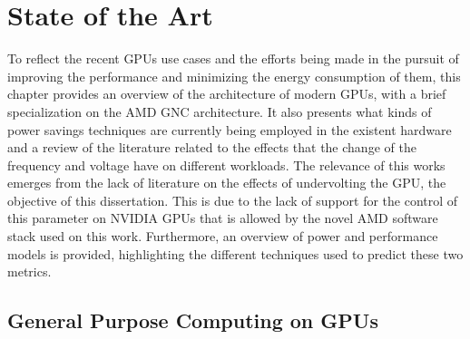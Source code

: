 
\chapter{State of the Art}
\label{chapter:stateoftheart}


To reflect the recent GPUs use cases and the efforts being made in the pursuit of improving the performance and minimizing the energy consumption of them, this chapter provides an overview of the architecture of modern GPUs, with a brief specialization on the AMD GNC architecture. It also presents what kinds of power savings techniques are currently being employed in the existent hardware and a review of the literature related to the effects that the change of the frequency and voltage have on different workloads. The relevance of this works emerges from the lack of literature on the effects of undervolting the GPU, the objective of this dissertation. This is due to the lack of support for the control of this parameter on NVIDIA GPUs that is allowed by the novel AMD software stack used on this work. Furthermore, an overview of power and performance models is provided, highlighting the different techniques used to predict these two metrics. 


\section{General Purpose Computing on GPUs}
\label{section:gpuarch}

